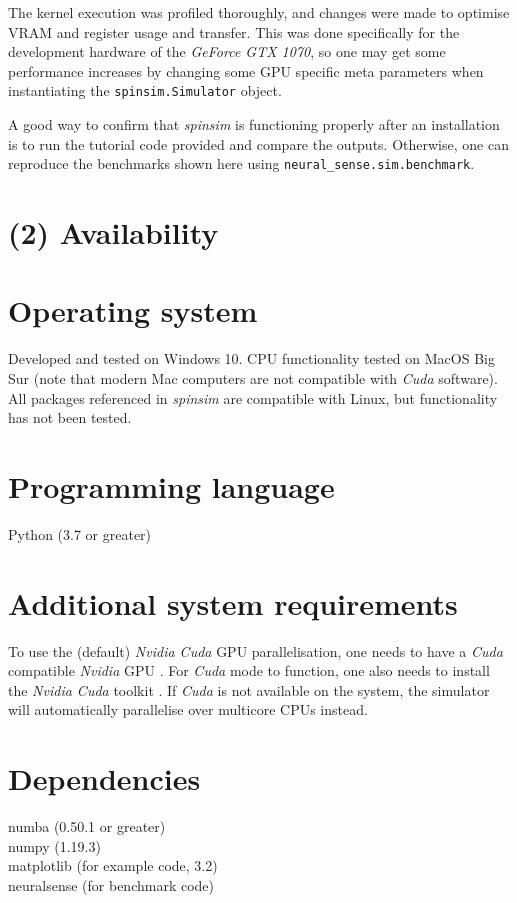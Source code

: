 \documentclass{jors}
\begin{document}
		The kernel execution was profiled thoroughly, and changes were made to optimise VRAM and register usage and transfer.
		This was done specifically for the development hardware of the \emph{GeForce GTX 1070}, so one may get some performance increases by changing some GPU specific meta parameters when instantiating the \texttt{spinsim.Simulator} object.

		A good way to confirm that \emph{spinsim} is functioning properly after an installation is to run the tutorial code provided and compare the outputs.
		Otherwise, one can reproduce the benchmarks shown here using \texttt{neural\_sense.sim.benchmark}.

\section{(2) Availability}
\vspace{0.5cm}
\section{Operating system}
Developed and tested on Windows 10.
CPU functionality tested on MacOS Big Sur (note that modern Mac computers are not compatible with \emph{Cuda} software).
All packages referenced in \emph{spinsim} are compatible with Linux, but functionality has not been tested.

\section{Programming language}
Python (3.7 or greater)

\section{Additional system requirements}
To use the (default) \emph{Nvidia Cuda} GPU parallelisation, one needs to have a \emph{Cuda} compatible \emph{Nvidia} GPU \cite{noauthor_cuda_2012}.
For \emph{Cuda} mode to function, one also needs to install the \emph{Nvidia Cuda} toolkit \cite{noauthor_cuda_2013}.
If \emph{Cuda} is not available on the system, the simulator will automatically parallelise over multicore CPUs instead.

\section{Dependencies}
numba (0.50.1 or greater)\\
numpy (1.19.3)\\
matplotlib (for example code, 3.2)\\
neuralsense (for benchmark code)
\end{document}
